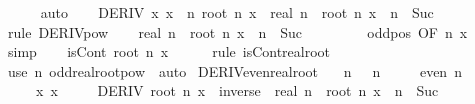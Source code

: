 \begin{isabellebody}
\ \ \ \ \isamarkupfalse%
\ auto\isanewline
\ \ \isamarkupfalse%
\ {\isachardoublequoteopen}DERIV\ {\isacharparenleft}{\kern0pt}{\isasymlambda}x{\isachardot}{\kern0pt}\ x\ {\isacharcircum}{\kern0pt}\ n{\isacharparenright}{\kern0pt}\ {\isacharparenleft}{\kern0pt}root\ n\ x{\isacharparenright}{\kern0pt}\ {\isacharcolon}{\kern0pt}{\isachargreater}{\kern0pt}\ real\ n\ {\isacharasterisk}{\kern0pt}\ root\ n\ x\ {\isacharcircum}{\kern0pt}\ {\isacharparenleft}{\kern0pt}n\ {\isacharminus}{\kern0pt}\ Suc\ {}{\isacharparenright}{\kern0pt}{\isachardoublequoteclose}\isanewline
\ \ \ \ \isamarkupfalse%
\ {\isacharparenleft}{\kern0pt}rule\ DERIV{\isacharunderscore}{\kern0pt}pow{\isacharparenright}{\kern0pt}\isanewline
\ \ \isamarkupfalse%
\ {\isachardoublequoteopen}real\ n\ {\isacharasterisk}{\kern0pt}\ root\ n\ x\ {\isacharcircum}{\kern0pt}\ {\isacharparenleft}{\kern0pt}n\ {\isacharminus}{\kern0pt}\ Suc\ {}{\isacharparenright}{\kern0pt}\ {\isasymnoteq}\ {}{\isachardoublequoteclose}\isanewline
\ \ \ \ \isamarkupfalse%
\ odd{\isacharunderscore}{\kern0pt}pos\ {\isacharbrackleft}{\kern0pt}OF\ n{\isacharbrackright}{\kern0pt}\ x\ \isamarkupfalse%
\ simp\isanewline
\ \ \isamarkupfalse%
\ {\isachardoublequoteopen}isCont\ {\isacharparenleft}{\kern0pt}root\ n{\isacharparenright}{\kern0pt}\ x{\isachardoublequoteclose}\isanewline
\ \ \ \ \isamarkupfalse%
\ {\isacharparenleft}{\kern0pt}rule\ isCont{\isacharunderscore}{\kern0pt}real{\isacharunderscore}{\kern0pt}root{\isacharparenright}{\kern0pt}\isanewline
{}\isamarkupfalse%
\ {\isacharparenleft}{\kern0pt}use\ n\ odd{\isacharunderscore}{\kern0pt}real{\isacharunderscore}{\kern0pt}root{\isacharunderscore}{\kern0pt}pow\ \ auto{\isacharparenright}{\kern0pt}%
\endisatagproof
{\isafoldproof}%
%
\isadelimproof
\isanewline
%
\endisadelimproof
\isanewline
{}\isamarkupfalse%
\ DERIV{\isacharunderscore}{\kern0pt}even{\isacharunderscore}{\kern0pt}real{\isacharunderscore}{\kern0pt}root{\isacharcolon}{\kern0pt}\isanewline
\ \ \ n{\isacharcolon}{\kern0pt}\ {\isachardoublequoteopen}{}\ {\isacharless}{\kern0pt}\ n{\isachardoublequoteclose}\isanewline
\ \ \ \ \ {\isachardoublequoteopen}even\ n{\isachardoublequoteclose}\isanewline
\ \ \ \ \ x{\isacharcolon}{\kern0pt}\ {\isachardoublequoteopen}x\ {\isacharless}{\kern0pt}\ {}{\isachardoublequoteclose}\isanewline
\ \ \ {\isachardoublequoteopen}DERIV\ {\isacharparenleft}{\kern0pt}root\ n{\isacharparenright}{\kern0pt}\ x\ {\isacharcolon}{\kern0pt}{\isachargreater}{\kern0pt}\ inverse\ {\isacharparenleft}{\kern0pt}{\isacharminus}{\kern0pt}\ real\ n\ {\isacharasterisk}{\kern0pt}\ root\ n\ x\ {\isacharcircum}{\kern0pt}\ {\isacharparenleft}{\kern0pt}n\ {\isacharminus}{\kern0pt}\ Suc\ {}{\isacharparenright}{\kern0pt}{\isacharparenright}{\kern0pt}{\isachardoublequoteclose}\isanewline

\end{isabellebody}
